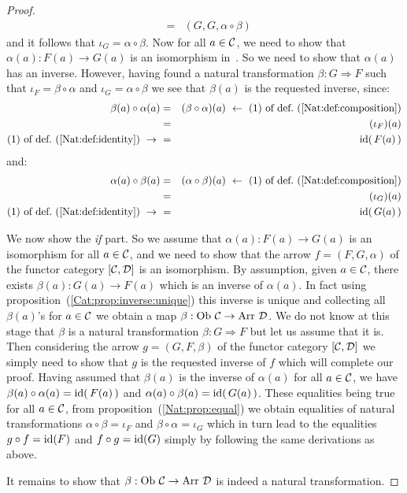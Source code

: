 \begin{proof}
\begin{eqnarray*}
            &=&(G,G,\alpha\circ\beta)
        \end{eqnarray*}
    and it follows that $\iota_{G}=\alpha\circ\beta$. Now for all $a\in\mbox{$\cal C$}$,
    we need to show that $\alpha(a):F(a)\to G(a)$ is an isomorphism in~\Dat.
    So we need to show that $\alpha(a)$ has an inverse. However, having found
    a natural transformation $\beta : G\Rightarrow F$ such that 
    $\iota_{F}=\beta\circ\alpha$ and $\iota_{G}=\alpha\circ\beta$ we see that
    $\beta(a)$ is the requested inverse, since:
        \begin{eqnarray*}\beta(a)\circ\alpha(a)
            &=&(\beta\circ\alpha)(a)\ \leftarrow\ 
            \mbox{$(1)$ of def.~(\ref{Nat:def:composition})}\\
            &=&(\iota_{F})(a)\\
            \mbox{$(1)$ of def.~(\ref{Nat:def:identity})}\ \to\ 
            &=&\id(\,F(a)\,)
        \end{eqnarray*}
    and:
        \begin{eqnarray*}\alpha(a)\circ\beta(a)
            &=&(\alpha\circ\beta)(a)\ \leftarrow\ 
            \mbox{$(1)$ of def.~(\ref{Nat:def:composition})}\\
            &=&(\iota_{G})(a)\\
            \mbox{$(1)$ of def.~(\ref{Nat:def:identity})}\ \to\ 
            &=&\id(\,G(a)\,)
        \end{eqnarray*}

    We now show the {\em if} part. So we assume that $\alpha(a):F(a)\to G(a)$ 
    is an isomorphism for all $a\in\mbox{$\cal C$}$, and we need to show that the arrow
    $f=(F,G,\alpha)$ of the functor category $[\mbox{$\cal C$},\mbox{$\cal D$}]$ is an isomorphism.
    By assumption, given $a\in\mbox{$\cal C$}$, there exists $\beta(a):G(a)\to F(a)$ which
    is an inverse of $\alpha(a)$. In fact using 
    proposition~(\ref{Cat:prop:inverse:unique}) this inverse is unique and
    collecting all $\beta(a)$'s for $a\in\mbox{$\cal C$}$ we obtain a map
    $\beta:\ob\ \Cat\to\arr\ \Dat$. We do not know at this stage that 
    $\beta$ is a natural transformation $\beta:G\Rightarrow F$ but let us
    assume that it is. Then considering the arrow $g=(G,F,\beta)$ of the 
    functor category $[\mbox{$\cal C$},\mbox{$\cal D$}]$ we simply need to show that $g$ is the 
    requested inverse of $f$ which will complete our proof. Having
    assumed that $\beta(a)$ is the inverse of $\alpha(a)$ for all $a\in\mbox{$\cal C$}$,
    we have $\beta(a)\circ\alpha(a)=\mbox{\rm id}(\,F(a)\,)$ and 
    $\alpha(a)\circ\beta(a)=\mbox{\rm id}(\,G(a)\,)$. These equalities being true 
    for all $a\in\mbox{$\cal C$}$, from proposition~(\ref{Nat:prop:equal}) we obtain
    equalities of natural transformations $\alpha\circ\beta=\iota_{F}$
    and $\beta\circ\alpha=\iota_{G}$ which in turn lead to the equalities
    $g\circ f=\mbox{\rm id}(F)$ and $f\circ g=\mbox{\rm id}(G)$ simply by following the same
    derivations as above. 

    It remains to show that $\beta:\ob\ \Cat\to\arr\ \Dat$ is indeed a natural
    transformation.

\end{proof}
